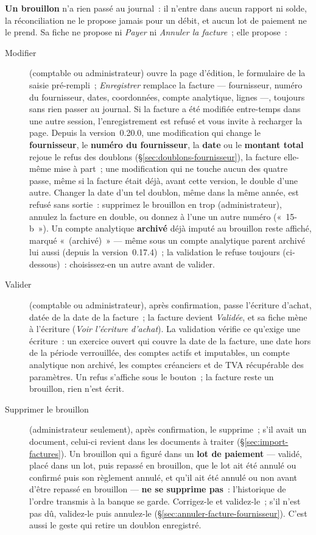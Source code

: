 \documentclass[a4paper,11pt,oneside]{article}
\begin{document}
\textbf{Un brouillon} n'a rien passé au journal~: il n'entre dans aucun rapport ni solde, la
réconciliation ne le propose jamais pour un débit, et aucun lot de paiement ne le prend. Sa
fiche ne propose ni \emph{Payer} ni \emph{Annuler la facture}~; elle propose~:
\begin{description}
    \item[Modifier] (comptable ou administrateur) ouvre la page d'édition, le formulaire de la
          saisie pré-rempli~; \emph{Enregistrer} remplace la facture --- fournisseur, numéro du fournisseur,
          dates, coordonnées, compte analytique, lignes ---, toujours sans rien passer au journal. Si la
          facture a été modifiée entre-temps dans une autre session, l'enregistrement est refusé
          et vous invite à recharger la page. Depuis la version~0.20.0, une modification qui change
          le \textbf{fournisseur}, le \textbf{numéro du fournisseur}, la \textbf{date} ou le
          \textbf{montant total} rejoue le refus des doublons (\S\ref{sec:doublons-fournisseur}),
          la facture elle-même mise à part~; une modification qui ne touche aucun des quatre passe,
          même si la facture était déjà, avant cette version, le double d'une autre. Changer la
          date d'un tel doublon, même dans la même année, est refusé sans sortie~: supprimez le
          brouillon en trop (administrateur), annulez la facture en double, ou donnez à l'une un
          autre numéro («~15-b~»). Un compte analytique \textbf{archivé} déjà imputé au brouillon
          reste affiché, marqué «~(archivé)~» --- même sous un compte analytique parent archivé lui
          aussi (depuis la version~0.17.4)~; la validation le refuse toujours (ci-dessous)~:
          choisissez-en un autre avant de valider.
    \item[Valider] (comptable ou administrateur), après confirmation, passe l'écriture d'achat,
          datée de la date de la facture~; la facture devient \emph{Validée}, et sa fiche mène à
          l'écriture (\emph{Voir l'écriture d'achat}). La validation vérifie ce qu'exige une
          écriture~: un exercice ouvert qui couvre la date de la facture, une date hors de la
          période verrouillée, des comptes actifs et imputables, un compte analytique non archivé, les
          comptes créanciers et de TVA récupérable des paramètres. Un refus s'affiche sous le
          bouton~; la facture reste un brouillon, rien n'est écrit.
    \item[Supprimer le brouillon] (administrateur seulement), après confirmation, le supprime~;
          s'il avait un document, celui-ci revient dans les documents à traiter
          (\S\ref{sec:import-factures}). Un brouillon qui a figuré dans un \textbf{lot de
          paiement} --- validé, placé dans un lot, puis repassé en brouillon, que le lot ait été
          annulé ou confirmé puis son règlement annulé, et qu'il ait été annulé ou non avant
          d'être repassé en brouillon --- \textbf{ne se supprime pas}~: l'historique de
          l'ordre transmis à la banque se garde. Corrigez-le et validez-le~; s'il n'est pas dû,
          validez-le puis annulez-le (\S\ref{sec:annuler-facture-fournisseur}). C'est aussi le
          geste qui retire un doublon enregistré.
\end{description}
\end{document}
